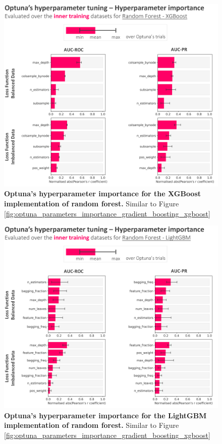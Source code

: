 \documentclass[nhess, manuscript]{copernicus}
\begin{document}
\begin{figure}[t]
\includegraphics[width=12cm]{figures/optuna_parameters_importance_random_forest_xgboost.png}
\caption{\textbf{Optuna's hyperparameter importance for the XGBoost implementation of random forest.} Similar to Figure \ref{fig:optuna_parameters_importance_gradient_boosting_xgboost}}
\label{fig:optuna_parameters_importance_random_forest_xgboost}
\end{figure}

\begin{figure}[t]
\includegraphics[width=12cm]{figures/optuna_parameters_importance_random_forest_lightgbm.png}
\caption{\textbf{Optuna's hyperparameter importance for the LightGBM implementation of random forest.} Similar to Figure \ref{fig:optuna_parameters_importance_gradient_boosting_xgboost}}
\label{fig:optuna_parameters_importance_random_forest_lightgbm}
\end{figure}
\end{document}
